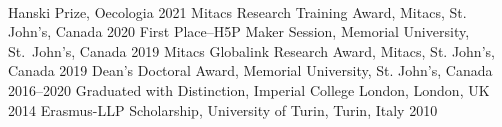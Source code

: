 \\

\begin{cvhonors}

  \mycvhonor
    {Hanski Prize,} %
    {Oecologia} %
    {2021} %
  \mycvhonor
    {Mitacs Research Training Award,} %
    {Mitacs, St. John's, Canada} %
    {2020} %
  \mycvhonor
    {First Place--H5P Maker Session,} %
    {Memorial University, St.~John's, Canada} %
    {2019} %
  \mycvhonor
    {Mitacs Globalink Research Award,} %
    {Mitacs, St. John's, Canada} %
    {2019} %
  \mycvhonor
    {Dean's Doctoral Award,} %
    {Memorial University, St. John's, Canada} %
    {2016--2020} %
  \mycvhonor
    {Graduated with Distinction,} %
    {Imperial College London, London, UK} %
    {2014} %
  \mycvhonor
    {Erasmus-LLP Scholarship,} %
    {University of Turin, Turin, Italy} %
    {2010} %
\end{cvhonors}